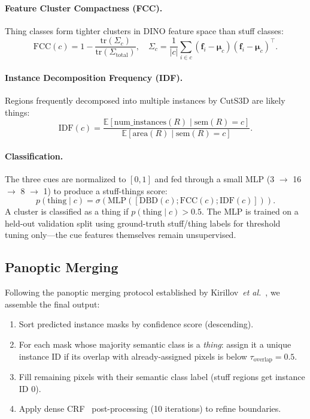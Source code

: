 \documentclass{article}
\newcommand{\etal}{\emph{et al.}}
\begin{document}
\paragraph{Feature Cluster Compactness (FCC).}
Thing classes form tighter clusters in DINO feature space than stuff classes:
\begin{equation}
\text{FCC}(c) = 1 - \frac{\text{tr}(\Sigma_c)}{\text{tr}(\Sigma_{\text{total}})}, \quad
\Sigma_c = \frac{1}{|c|}\sum_{i \in c}(\mathbf{f}_i - \boldsymbol{\mu}_c)(\mathbf{f}_i - \boldsymbol{\mu}_c)^\top.
\label{eq:fcc}
\end{equation}

\paragraph{Instance Decomposition Frequency (IDF).}
Regions frequently decomposed into multiple instances by CutS3D are likely things:
\begin{equation}
\text{IDF}(c) = \frac{\mathbb{E}[\text{num\_instances}(R) \mid \text{sem}(R) = c]}{\mathbb{E}[\text{area}(R) \mid \text{sem}(R) = c]}.
\label{eq:idf}
\end{equation}

\paragraph{Classification.}
The three cues are normalized to $[0, 1]$ and fed through a small MLP (3 $\rightarrow$ 16 $\rightarrow$ 8 $\rightarrow$ 1) to produce a stuff-things score:
\begin{equation}
p(\text{thing} \mid c) = \sigma\!\left(\text{MLP}([\text{DBD}(c); \text{FCC}(c); \text{IDF}(c)])\right).
\label{eq:stc}
\end{equation}
A cluster is classified as a thing if $p(\text{thing} \mid c) > 0.5$. The MLP is trained on a held-out validation split using ground-truth stuff/thing labels for threshold tuning only---the cue features themselves remain unsupervised.


\subsection{Panoptic Merging}
\label{sec:merge}

Following the panoptic merging protocol established by Kirillov~\etal~\cite{kirillov2019panoptic}, we assemble the final output:
\begin{enumerate}
    \item Sort predicted instance masks by confidence score (descending).
    \item For each mask whose majority semantic class is a \emph{thing}: assign it a unique instance ID if its overlap with already-assigned pixels is below $\tau_{\text{overlap}} = 0.5$.
    \item Fill remaining pixels with their semantic class label (stuff regions get instance ID 0).
    \item Apply dense CRF~\cite{krahenbuhl2011crf} post-processing (10 iterations) to refine boundaries.
\end{enumerate}
\end{document}
